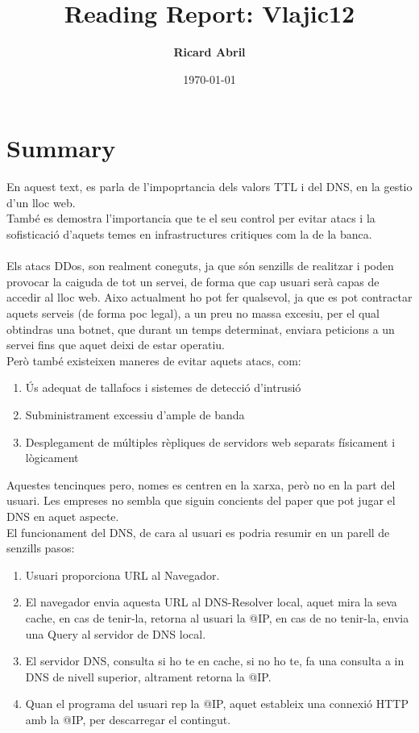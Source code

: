 \documentclass[a4paper, 10pt]{article}
\title{Reading Report: Vlajic12}
\author{\textbf{Ricard Abril}}
\date{\normalsize\today{}}
\begin{document}
\maketitle


\section{Summary}

En aquest text, es parla de l'impoprtancia dels valors TTL i del DNS, en la gestio d'un lloc web.\\
També es demostra l'importancia que te el seu control per evitar atacs i la sofisticació d'aquets temes en infrastructures critiques com la de la banca.\\\\

Els atacs DDos, son realment coneguts, ja que són senzills de realitzar i poden provocar la caiguda de tot un servei, de forma que cap usuari serà capas de accedir al lloc web.  Aixo actualment ho pot fer qualsevol, ja que es pot contractar aquets serveis (de forma poc legal), a un preu no massa excesiu, per el qual obtindras una botnet, que durant un temps determinat, enviara peticions a un servei fins que aquet deixi de estar operatiu.\\

Però també existeixen maneres de evitar aquets atacs, com:
\begin{enumerate}
\item Ús adequat de tallafocs i sistemes de detecció d’intrusió
\item  Subministrament excessiu d’ample de banda
\item Desplegament de múltiples rèpliques de servidors web separats físicament i lògicament
\end{enumerate}

Aquestes tencinques pero, nomes es centren en la xarxa, però no en la part del usuari. Les empreses no sembla que siguin concients del paper que pot jugar el DNS en aquet aspecte.\\

El funcionament del DNS, de cara al usuari es podria resumir en un parell de senzills pasos:

\begin{enumerate}
\item Usuari proporciona URL al Navegador.
\item El navegador envia aquesta URL al DNS-Resolver local, aquet mira la seva cache, en cas de tenir-la, retorna al usuari la @IP, en cas de no tenir-la, envia una Query al servidor de DNS local.
\item El servidor DNS, consulta si ho te en cache, si no ho te, fa una consulta a in DNS de nivell superior, altrament retorna la @IP.
\item Quan el programa del usuari rep la @IP, aquet estableix una connexió HTTP amb la @IP, per descarregar el contingut.
\end{enumerate}
\end{document}
